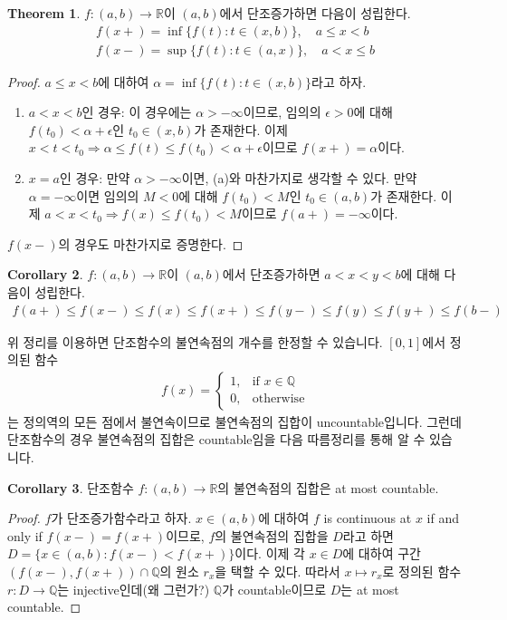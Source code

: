 \documentclass[12pt]{article}
\theoremstyle{definition}
\newtheorem{thm}{Theorem}[section]
\newtheorem{cor}[thm]{Corollary}
\def\RR{\mathbb{R}}
\def\eps{\epsilon}
\begin{document}
\begin{thm}
	\(f: (a, b) \rightarrow \RR\)이 \((a, b)\)에서 단조증가하면 다음이 성립한다.
	\begin{gather*}
		f(x+) = \inf\{f(t): t \in (x, b)\}, \quad a \le x < b\\
		f(x-) = \sup\{f(t): t \in (a, x)\}, \quad a < x \le b
	\end{gather*}
\end{thm}
\begin{proof}
	\(a \le x < b\)에 대하여 \(\alpha = \inf\{f(t): t \in (x, b)\}\)라고 하자.
	\begin{enumerate} [label=(\alph*), leftmargin=2\parindent]
		\item
		\(a < x < b\)인 경우: 이 경우에는 \(\alpha > -\infty\)이므로, 임의의 \(\eps > 0\)에 대해 \(f(t_0) < \alpha + \eps\)인 \(t_0 \in (x, b)\)가 존재한다. 이제 \(x < t < t_0 \Longrightarrow \alpha \le f(t) \le f(t_0) < \alpha + \eps\)이므로 \(f(x+) = \alpha\)이다. 
		\item
		\(x = a\)인 경우: 만약 \(\alpha > -\infty\)이면, (a)와 마찬가지로 생각할 수 있다. 만약 \(\alpha = -\infty\)이면 임의의 \(M < 0\)에 대해 \(f(t_0) < M\)인 \(t_0 \in (a, b)\)가 존재한다. 이제 \(a < x < t_0 \Longrightarrow f(x) \le f(t_0) < M\)이므로 \(f(a+) = -\infty\)이다.
	\end{enumerate}
	\(f(x-)\)의 경우도 마찬가지로 증명한다.
\end{proof}

\begin{cor} \label{limit}
	\(f: (a, b) \rightarrow \RR\)이 \((a, b)\)에서 단조증가하면 \(a < x < y < b\)에 대해 다음이 성립한다. 
	\begin{gather*}
		f(a+) \le f(x-) \le f(x) \le f(x+) \le f(y-) \le f(y) \le f(y+) \le f(b-)
	\end{gather*}
\end{cor}

위 정리를 이용하면 단조함수의 불연속점의 개수를 한정할 수 있습니다. \([0, 1]\)에서 정의된 함수
\begin{gather*}
	f(x)=
	\begin{cases}
		1, &\text{if } x \in \mathbb{Q}\\
		0, &\text{otherwise}
	\end{cases}
\end{gather*}
는 정의역의 모든 점에서 불연속이므로 불연속점의 집합이 uncountable입니다. 그런데 단조함수의 경우 불연속점의 집합은 countable임을 다음 따름정리를 통해 알 수 있습니다.

\begin{cor} \label{cor mono disconti}
	단조함수 \(f: (a, b) \rightarrow \RR\)의 불연속점의 집합은 at most countable.
\end{cor}
\begin{proof}
	\(f\)가 단조증가함수라고 하자. \(x \in (a, b)\)에 대하여 \(f\) is continuous at \(x\) if and only if \(f(x-) = f(x+)\)이므로, \(f\)의 불연속점의 집합을 \(D\)라고 하면 \(D = \{x \in (a, b): f(x-) < f(x+)\}\)이다. 이제 각 \(x \in D\)에 대하여 구간 \((f(x-), f(x+)) \cap \mathbb{Q}\)의 원소 \(r_x\)을 택할 수 있다. 따라서 \(x \mapsto r_x\)로 정의된 함수 \(r:D \rightarrow \mathbb{Q}\)는 injective인데(왜 그런가?) \(\mathbb{Q}\)가 countable이므로 \(D\)는 at most countable.
\end{proof}
\end{document}
